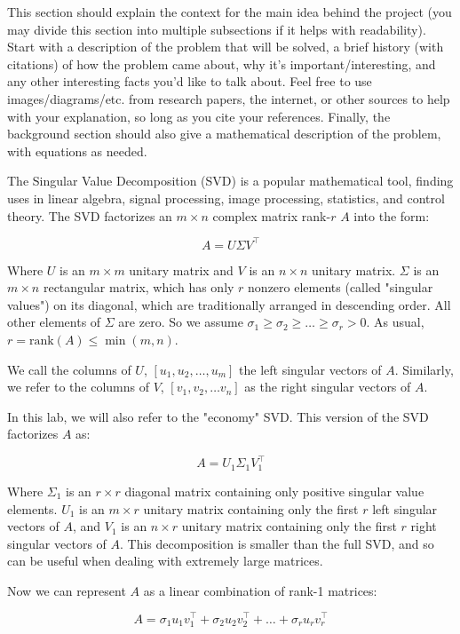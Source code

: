 This section should explain the context for the main idea behind the project (you may divide this section into multiple subsections if it helps with readability). Start with a description of the problem that will be solved, a brief history (with citations) of how the problem came about, why it’s important/interesting, and any other interesting facts you’d like to talk about. Feel free to use images/diagrams/etc. from research papers, the internet, or other sources to help with your explanation, so long as you cite your references. Finally, the background section should also give a mathematical description of the problem, with equations as needed.

The Singular Value Decomposition (SVD) is a popular mathematical tool, finding uses in linear algebra, signal processing, image processing, statistics, and control theory. The SVD factorizes an $m\times n$ complex matrix rank-$r$ $A$ into the form:

\[ A = U \Sigma V^\intercal \]

Where $U$ is an $m\times m$ unitary matrix and $V$ is an $n \times n$ unitary matrix. $\Sigma$ is an $m \times n$ rectangular matrix, which has only $r$ nonzero elements (called "singular values") on its diagonal, which are traditionally arranged in descending order. All other elements of $\Sigma$ are zero. So we assume $\sigma_1 \geq \sigma_2 \geq \ldots \geq \sigma_r > 0$. As usual, $r = \mathrm{rank}(A) \leq \min(m,n)$.

We call the columns of $U$, $[u_1, u_2, \ldots, u_m]$ the left singular vectors of $A$. Similarly, we refer to the columns of $V$, $[v_1, v_2, \ldots v_n]$ as the right singular vectors of $A$.

In this lab, we will also refer to the "economy" SVD. This version of the SVD factorizes $A$ as:

\[ A = U_1 \Sigma_1 V_1^\intercal \]

Where $\Sigma_1$ is an $r \times r$ diagonal matrix containing only positive singular value elements. $U_1$ is an $m \times r$ unitary matrix containing only the first $r$ left singular vectors of $A$, and $V_1$ is an $n \times r$ unitary matrix containing only the first $r$ right singular vectors of $A$. This decomposition is smaller than the full SVD, and so can be useful when dealing with extremely large matrices.

Now we can represent $A$ as a linear combination of rank-1 matrices:

\[ A = \sigma_1 u_1 v_1^\intercal + \sigma_2 u_2 v_2^\intercal + \ldots + \sigma_r u_r v_r^\intercal \]

